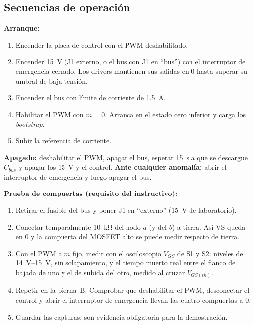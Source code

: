 \documentclass[10pt,twocolumn,letterpaper]{article}
\begin{document}
\subsection{Secuencias de operación}
\textbf{Arranque:}
\begin{enumerate}[leftmargin=*]
\item Encender la placa de control con el PWM deshabilitado.
\item Encender \SI{15}{\volt} (J1 externo, o el bus con J1 en ``bus'') con el interruptor de emergencia cerrado. Los drivers mantienen sus salidas en 0 hasta superar su umbral de baja tensión.
\item Encender el bus con límite de corriente de \SI{1,5}{\ampere}.
\item Habilitar el PWM con $m=0$. Arranca en el estado cero inferior y carga los \emph{bootstrap}.
\item Subir la referencia de corriente.
\end{enumerate}
\textbf{Apagado:} deshabilitar el PWM, apagar el bus, esperar \SI{15}{\second} a que se descargue $C_{bus}$ y apagar los \SI{15}{\volt} y el control. \textbf{Ante cualquier anomalía:} abrir el interruptor de emergencia y luego apagar el bus.

\textbf{Prueba de compuertas (requisito del instructivo):}
\begin{enumerate}[leftmargin=*]
\item Retirar el fusible del bus y poner J1 en ``externo'' (\SI{15}{\volt} de laboratorio).
\item Conectar temporalmente \SI{10}{\kilo\ohm} del nodo $a$ (y del $b$) a tierra. Así VS queda en 0 y la compuerta del MOSFET alto se puede medir respecto de tierra.
\item Con el PWM a $m$ fijo, medir con el osciloscopio $V_{GS}$ de S1 y S2: niveles de \SIrange{14}{15}{\volt}, sin solapamiento, y el tiempo muerto real entre el flanco de bajada de uno y el de subida del otro, medido al cruzar $V_{GS(th)}$.
\item Repetir en la pierna~B. Comprobar que deshabilitar el PWM, desconectar el control y abrir el interruptor de emergencia llevan las cuatro compuertas a 0.
\item Guardar las capturas: son evidencia obligatoria para la demostración.
\end{enumerate}

\end{document}
